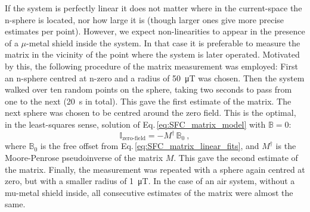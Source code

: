 If the system is perfectly linear it does not matter where in the current-space the n-sphere is located, nor how large it is (though larger ones give more precise estimates per point).
However, we expect non-linearities to appear in the presence of a $\mu$-metal shield inside the system.
In that case it is preferable to measure the matrix in the vicinity of the point where the system is later operated.
Motivated by this, the following procedure of the matrix measurement was employed:
First an n-sphere centred at n-zero and a radius of \SI{50}{\micro\tesla} was chosen.
Then the system walked over ten random points on the sphere, taking two seconds to pass from one to the next (\SI{20}{\second} in total).
This gave the first estimate of the matrix.
The next sphere was chosen to be centred around the zero field. This is the optimal, in the least-squares sense, solution of Eq.\,\ref{eq:SFC_matrix_model} with $\mathbb{B} = 0$:
\begin{equation}
  \label{eq:SFC_zero_field_requirement}
  \mathbb{I}_\text{zero-field} = - M^\dagger \, \mathbb{B}_0 \ ,
\end{equation}
where $\mathbb{B}_0$ is the free offset from Eq.\,\ref{eq:SFC_matrix_linear_fits}, and $M^\dagger$ is the Moore-Penrose pseudoinverse of the matrix $M$.
This gave the second estimate of the matrix.
Finally, the measurement was repeated with a sphere again centred at zero, but with a smaller radius of \SI{1}{\micro\tesla}.
In the case of an air system, without a mu-metal shield inside, all consecutive estimates of the matrix were almost the same.

